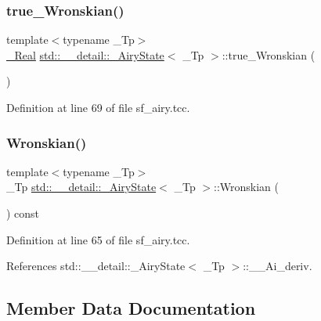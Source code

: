\subsubsection{\texorpdfstring{true\+\_\+\+Wronskian()}{true\_Wronskian()}}
{\footnotesize\ttfamily template$<$typename \+\_\+\+Tp$>$ \\
\hyperlink{structstd_1_1____detail_1_1__AiryState_ac18d07c685cbffed6173532d5f0c0cc9}{\+\_\+\+Real} \hyperlink{structstd_1_1____detail_1_1__AiryState}{std\+::\+\_\+\+\_\+detail\+::\+\_\+\+Airy\+State}$<$ \+\_\+\+Tp $>$\+::true\+\_\+\+Wronskian (\begin{DoxyParamCaption}{ }\end{DoxyParamCaption})\hspace{0.3cm}{\ttfamily [inline]}}



Definition at line 69 of file sf\+\_\+airy.\+tcc.

\mbox{\label{structstd_1_1____detail_1_1__AiryState_a565f891531681d918aa85320ad776428}} 
\subsubsection{\texorpdfstring{Wronskian()}{Wronskian()}}
{\footnotesize\ttfamily template$<$typename \+\_\+\+Tp$>$ \\
\+\_\+\+Tp \hyperlink{structstd_1_1____detail_1_1__AiryState}{std\+::\+\_\+\+\_\+detail\+::\+\_\+\+Airy\+State}$<$ \+\_\+\+Tp $>$\+::Wronskian (\begin{DoxyParamCaption}{ }\end{DoxyParamCaption}) const\hspace{0.3cm}{\ttfamily [inline]}}



Definition at line 65 of file sf\+\_\+airy.\+tcc.



References std\+::\+\_\+\+\_\+detail\+::\+\_\+\+Airy\+State$<$ \+\_\+\+Tp $>$\+::\+\_\+\+\_\+\+Ai\+\_\+deriv.



\subsection{Member Data Documentation}
\mbox{\label{structstd_1_1____detail_1_1__AiryState_a3d918b7b8cb09fd4bb57c10a5853c36f}} 
